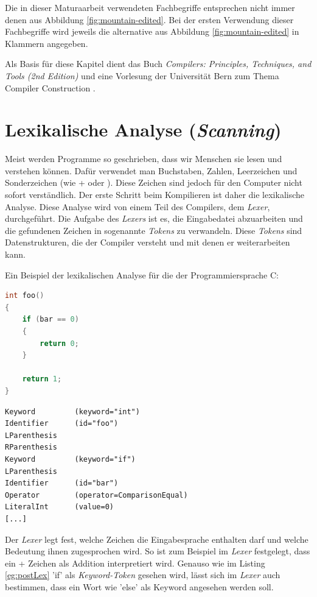Die in dieser Maturaarbeit verwendeten Fachbegriffe entsprechen nicht immer denen aus Abbildung \ref{fig:mountain-edited}.
Bei der ersten Verwendung dieser Fachbegriffe wird jeweils die alternative aus Abbildung \ref{fig:mountain-edited} in Klammern angegeben.

Als Basis für diese Kapitel dient das Buch \textit{Compilers: Principles, Techniques, and Tools (2nd Edition)} \cite{CompilersDragon} und eine Vorlesung der Universität Bern zum Thema Compiler Construction \cite{Lecture}.

\section{Lexikalische Analyse (\textit{Scanning})}
Meist werden Programme so geschrieben, dass wir Menschen sie lesen und verstehen können. Dafür verwendet man Buchstaben, Zahlen, Leerzeichen und Sonderzeichen (wie {\selectListingFont +} oder {\selectListingFont *}).
Diese Zeichen sind jedoch für den Computer nicht sofort verständlich. Der erste Schritt beim Kompilieren ist daher die lexikalische Analyse. Diese Analyse wird von einem Teil des Compilers, dem \textit{Lexer}, durchgeführt.
Die Aufgabe des \textit{Lexers} ist es, die Eingabedatei abzuarbeiten und die gefundenen Zeichen in sogenannte \textit{Tokens} zu verwandeln. Diese \textit{Tokens} sind Datenstrukturen, die der Compiler versteht und mit denen er weiterarbeiten kann.

Ein Beispiel der lexikalischen Analyse für die der Programmiersprache C:

\begin{lstlisting}[language=C, label=eg:preLex, caption=C code vor lexikalischer Analyse]
int foo()
{
    if (bar == 0)
    {
        return 0;
    }

    return 1;
}
\end{lstlisting}

\begin{lstlisting}[label=eg:postLex, caption=\textit{Tokens} nach lexikalischer Analyse]
Keyword         (keyword="int")
Identifier      (id="foo")
LParenthesis
RParenthesis
Keyword         (keyword="if")
LParenthesis
Identifier      (id="bar")
Operator        (operator=ComparisonEqual)
LiteralInt      (value=0)
[...]
\end{lstlisting}

Der \textit{Lexer} legt fest, welche Zeichen die Eingabesprache enthalten darf und welche Bedeutung ihnen zugesprochen wird. So ist zum Beispiel im \textit{Lexer} festgelegt, dass ein {\selectListingFont +} Zeichen als Addition interpretiert wird.
Genauso wie im Listing \ref{eg:postLex} {\listingFont\selectfont 'if'} als \textit{Keyword-Token} gesehen wird, lässt sich im \textit{Lexer} auch bestimmen, dass ein Wort wie {\listingFont\selectfont 'else'} als Keyword angesehen werden soll.

